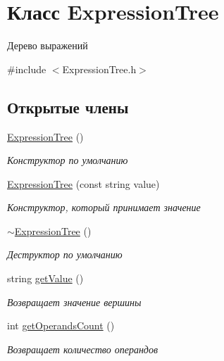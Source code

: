 \hypertarget{class_expression_tree}{}\section{Класс Expression\+Tree}
\label{class_expression_tree}


Дерево выражений  




{\ttfamily \#include $<$Expression\+Tree.\+h$>$}

\subsection*{Открытые члены}
\begin{DoxyCompactItemize}
\item 
\mbox{\hyperlink{class_expression_tree_a0d743ee804cf5d9c792906f936151886}{Expression\+Tree}} ()
\begin{DoxyCompactList}\small\item\em Конструктор по умолчанию \end{DoxyCompactList}\item 
\mbox{\hyperlink{class_expression_tree_aa158e3eced2b61eedabec90ff8f62a3b}{Expression\+Tree}} (const string value)
\begin{DoxyCompactList}\small\item\em Конструктор, который принимает значение \end{DoxyCompactList}\item 
\mbox{\hyperlink{class_expression_tree_a7c172d77927af5a57fded65b1777fc17}{$\sim$\+Expression\+Tree}} ()
\begin{DoxyCompactList}\small\item\em Деструктор по умолчанию \end{DoxyCompactList}\item 
string \mbox{\hyperlink{class_expression_tree_ab8b29bfa5c593849c39becf1b501c80f}{get\+Value}} ()
\begin{DoxyCompactList}\small\item\em Возвращает значение вершины \end{DoxyCompactList}\item 
int \mbox{\hyperlink{class_expression_tree_a8b072f45d0e8dbcd9aa7159c10792407}{get\+Operands\+Count}} ()
\begin{DoxyCompactList}\small\item\em Возвращает количество операндов \end{DoxyCompactList}\item 

\end{DoxyCompactItemize}
